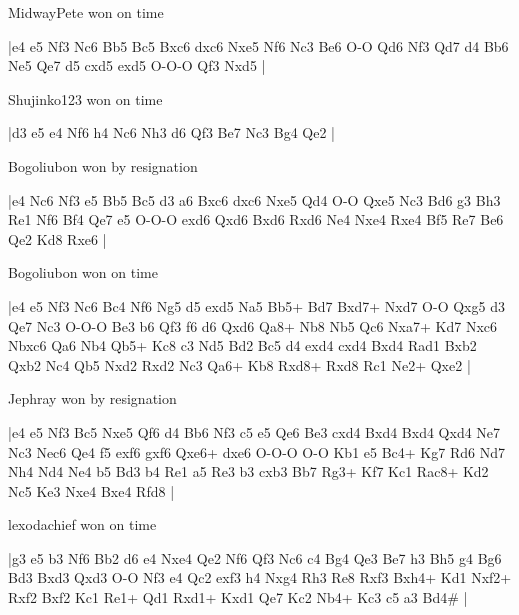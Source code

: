 \showboard

MidwayPete won on time

\makegametitle
|e4 e5 Nf3 Nc6 Bb5 Bc5 Bxc6 dxc6 Nxe5 Nf6 Nc3 Be6 O-O Qd6 Nf3 Qd7 d4 Bb6 Ne5 Qe7 d5 cxd5 exd5 O-O-O Qf3 Nxd5  |

\showboard

Shujinko123 won on time

\makegametitle
|d3 e5 e4 Nf6 h4 Nc6 Nh3 d6 Qf3 Be7 Nc3 Bg4 Qe2  |

\showboard

Bogoliubon won by resignation

\makegametitle
|e4 Nc6 Nf3 e5 Bb5 Bc5 d3 a6 Bxc6 dxc6 Nxe5 Qd4 O-O Qxe5 Nc3 Bd6 g3 Bh3 Re1 Nf6 Bf4 Qe7 e5 O-O-O exd6 Qxd6 Bxd6 Rxd6 Ne4 Nxe4 Rxe4 Bf5 Re7 Be6 Qe2 Kd8 Rxe6  |

\showboard

Bogoliubon won on time

\makegametitle
|e4 e5 Nf3 Nc6 Bc4 Nf6 Ng5 d5 exd5 Na5 Bb5+ Bd7 Bxd7+ Nxd7 O-O Qxg5 d3 Qe7 Nc3 O-O-O Be3 b6 Qf3 f6 d6 Qxd6 Qa8+ Nb8 Nb5 Qc6 Nxa7+ Kd7 Nxc6 Nbxc6 Qa6 Nb4 Qb5+ Kc8 c3 Nd5 Bd2 Bc5 d4 exd4 cxd4 Bxd4 Rad1 Bxb2 Qxb2 Nc4 Qb5 Nxd2 Rxd2 Nc3 Qa6+ Kb8 Rxd8+ Rxd8 Rc1 Ne2+ Qxe2  |

\showboard

Jephray won by resignation

\makegametitle
|e4 e5 Nf3 Bc5 Nxe5 Qf6 d4 Bb6 Nf3 c5 e5 Qe6 Be3 cxd4 Bxd4 Bxd4 Qxd4 Ne7 Nc3 Nec6 Qe4 f5 exf6 gxf6 Qxe6+ dxe6 O-O-O O-O Kb1 e5 Bc4+ Kg7 Rd6 Nd7 Nh4 Nd4 Ne4 b5 Bd3 b4 Re1 a5 Re3 b3 cxb3 Bb7 Rg3+ Kf7 Kc1 Rac8+ Kd2 Nc5 Ke3 Nxe4 Bxe4 Rfd8  |

\showboard

lexodachief won on time

\makegametitle
|g3 e5 b3 Nf6 Bb2 d6 e4 Nxe4 Qe2 Nf6 Qf3 Nc6 c4 Bg4 Qe3 Be7 h3 Bh5 g4 Bg6 Bd3 Bxd3 Qxd3 O-O Nf3 e4 Qc2 exf3 h4 Nxg4 Rh3 Re8 Rxf3 Bxh4+ Kd1 Nxf2+ Rxf2 Bxf2 Kc1 Re1+ Qd1 Rxd1+ Kxd1 Qe7 Kc2 Nb4+ Kc3 c5 a3 Bd4\#  |

